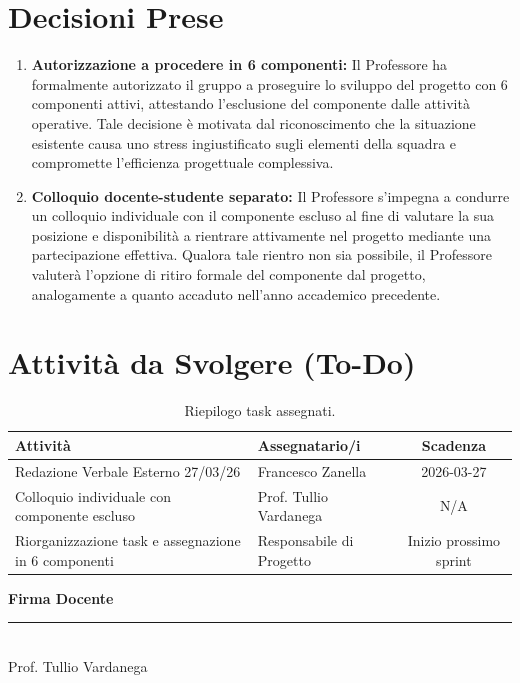 \documentclass[a4paper, 11pt, oneside]{scrartcl} %
\begin{document}
\section{Decisioni Prese}

\begin{enumerate}
\item \textbf{Autorizzazione a procedere in 6 componenti:} Il Professore ha formalmente autorizzato il gruppo a proseguire lo sviluppo del progetto con 6 componenti attivi, attestando l'esclusione del componente dalle attività operative. Tale decisione è motivata dal riconoscimento che la situazione esistente causa uno stress ingiustificato sugli elementi della squadra e compromette l'efficienza progettuale complessiva.

\item \textbf{Colloquio docente-studente separato:} Il Professore s'impegna a condurre un colloquio individuale con il componente escluso al fine di valutare la sua posizione e disponibilità a rientrare attivamente nel progetto mediante una partecipazione effettiva. Qualora tale rientro non sia possibile, il Professore valuterà l'opzione di ritiro formale del componente dal progetto, analogamente a quanto accaduto nell'anno accademico precedente.

\end{enumerate}

\newpage
\section{Attività da Svolgere (To-Do)}

\begin{table}[h!]
\centering
\begin{tabularx}{\textwidth}{@{}X l c@{}}
\toprule
\textbf{Attività} & \textbf{Assegnatario/i} & \textbf{Scadenza} \\
\midrule
Redazione Verbale Esterno 27/03/26 & Francesco Zanella & 2026-03-27 \\
\addlinespace
Colloquio individuale con componente escluso & Prof. Tullio Vardanega & N/A \\
\addlinespace
Riorganizzazione task e assegnazione in 6 componenti & Responsabile di Progetto & Inizio prossimo sprint \\
\bottomrule
\end{tabularx}
\caption{Riepilogo task assegnati.}
\end{table}

\vspace{2cm} 
\begin{flushright}
    \textbf{Firma Docente} \\[0.5cm]

    
    \vspace{3cm}
    \rule{6cm}{0.4pt} \\
    \small{Prof. Tullio Vardanega}
\end{flushright}
\end{document}
